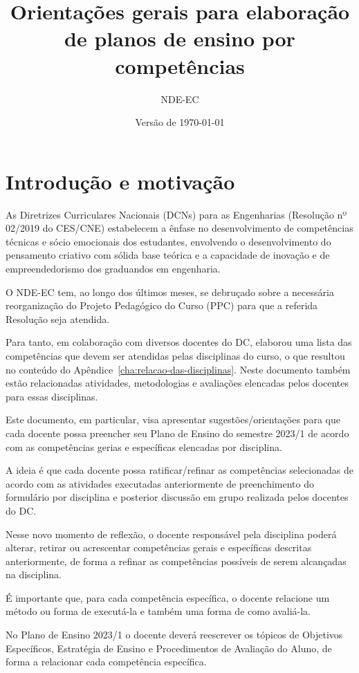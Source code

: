\documentclass[12pt, oneside]{book}
\title{Orientações gerais para elaboração de planos de ensino por competências}
\author{NDE-EC}
\date{Versão de \today}
\begin{document}
\maketitle

\frontmatter

\tableofcontents

\mainmatter


\chapter{Introdução e motivação}
As Diretrizes Curriculares Nacionais (DCNs) para as Engenharias (Resolução nº 02/2019 do CES/CNE) estabelecem a ênfase no desenvolvimento de competências técnicas e sócio emocionais dos estudantes, envolvendo o desenvolvimento do pensamento criativo com sólida base teórica e a capacidade de inovação e de empreendedorismo dos graduandos em engenharia.

O NDE-EC tem, ao longo dos últimos meses, se debruçado sobre a necessária reorganização do Projeto Pedagógico do Curso (PPC) para que a referida Resolução seja atendida.

Para tanto, em colaboração com diversos docentes do DC, elaborou uma lista das competências que devem ser atendidas pelas disciplinas do curso, o que resultou no conteúdo do Apêndice~\ref{cha:relacao-das-disciplinas}. Neste documento também estão relacionadas atividades, metodologias e avaliações elencadas pelos docentes para essas disciplinas.

Este documento, em particular, visa apresentar sugestões/orientações para que cada docente possa preencher seu Plano de Ensino do semestre 2023/1 de acordo com as competências gerias e específicas elencadas por disciplina.

A ideia é que cada docente possa ratificar/refinar as competências selecionadas de acordo com as atividades executadas anteriormente de preenchimento do formulário por disciplina e posterior discussão em grupo realizada pelos docentes do DC.

Nesse novo momento de reflexão, o docente responsável pela disciplina poderá alterar, retirar ou acrescentar competências gerais e específicas descritas anteriormente, de forma a refinar as competências possíveis de serem alcançadas na disciplina.

É importante que, para cada competência específica, o docente relacione um método ou forma de executá-la e também uma forma de como avaliá-la.

No Plano de Ensino 2023/1 o docente deverá reescrever os tópicos de Objetivos Específicos, Estratégia de Ensino e Procedimentos de Avaliação do Aluno, de forma a relacionar cada competência específica.
\end{document}
